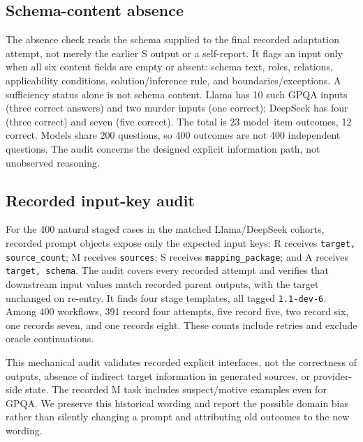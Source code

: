 \subsection{Schema-content absence}
The absence check reads the schema supplied to the final recorded adaptation attempt, not merely the earlier S output or a self-report. It flags an input only when all six content fields are empty or absent: schema text, roles, relations, applicability conditions, solution/inference rule, and boundaries/exceptions. A sufficiency status alone is not schema content. Llama has 10 such GPQA inputs (three correct answers) and two murder inputs (one correct); DeepSeek has four (three correct) and seven (five correct). The total is 23 model--item outcomes, 12 correct. Models share 200 questions, so 400 outcomes are not 400 independent questions. The audit concerns the designed explicit information path, not unobserved reasoning.

\subsection{Recorded input-key audit}
For the 400 natural staged cases in the matched Llama/DeepSeek cohorts, recorded prompt objects expose only the expected input keys: R receives \texttt{target, source\_count}; M receives \texttt{sources}; S receives \texttt{mapping\_package}; and A receives \texttt{target, schema}. The audit covers every recorded attempt and verifies that downstream input values match recorded parent outputs, with the target unchanged on re-entry. It finds four stage templates, all tagged \texttt{1.1-dev-6}. Among 400 workflows, 391 record four attempts, five record five, two record six, one records seven, and one records eight. These counts include retries and exclude oracle continuations.

This mechanical audit validates recorded explicit interfaces, not the correctness of outputs, absence of indirect target information in generated sources, or provider-side state. The recorded M task includes suspect/motive examples even for GPQA. We preserve this historical wording and report the possible domain bias rather than silently changing a prompt and attributing old outcomes to the new wording.

